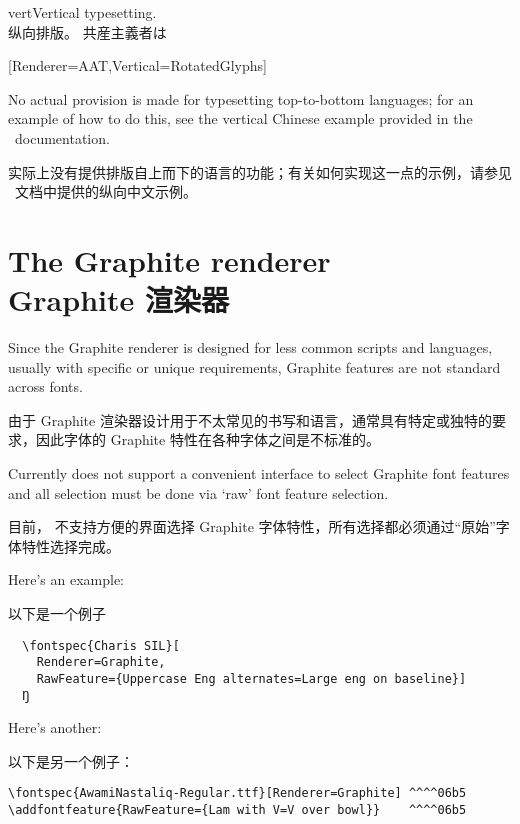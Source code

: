 \documentclass[a4paper]{l3doc}
\begin{document}
\begin{Xexample}[firstline=2]{vert}{Vertical typesetting.\\纵向排版。}
  \def\verttext{共産主義者は}
  \verttext

  [Renderer=AAT,Vertical=RotatedGlyphs]
  \rotatebox{-90}{\verttext}%
\end{Xexample}

No actual provision is made for typesetting top-to-bottom
languages; for an example of how to do this, see the vertical Chinese
example provided in the \XeTeX\ documentation.

实际上没有提供排版自上而下的语言的功能；有关如何实现这一点的示例，请参见 \XeTeX\ 文档中提供的纵向中文示例。
\section{The Graphite renderer\\Graphite 渲染器}
\label{sec:graphite-features}

Since the Graphite renderer is designed for less common scripts and languages, usually with
specific or unique requirements, Graphite features are not standard across fonts.

由于 Graphite 渲染器设计用于不太常见的书写和语言，通常具有特定或独特的要求，因此字体的 Graphite 特性在各种字体之间是不标准的。

Currently  does not support a convenient interface to select Graphite font
features and all selection must be done via `raw' font feature selection.

目前， 不支持方便的界面选择 Graphite 字体特性，所有选择都必须通过“原始”字体特性选择完成。

Here's an example:

以下是一个例子
\begin{Verbatim}
  \fontspec{Charis SIL}[
    Renderer=Graphite,
    RawFeature={Uppercase Eng alternates=Large eng on baseline}]
  Ŋ
\end{Verbatim}

Here's another:

以下是另一个例子：

\begin{Verbatim}
\fontspec{AwamiNastaliq-Regular.ttf}[Renderer=Graphite] ^^^^06b5
\addfontfeature{RawFeature={Lam with V=V over bowl}}    ^^^^06b5
\end{Verbatim}
\end{document}
